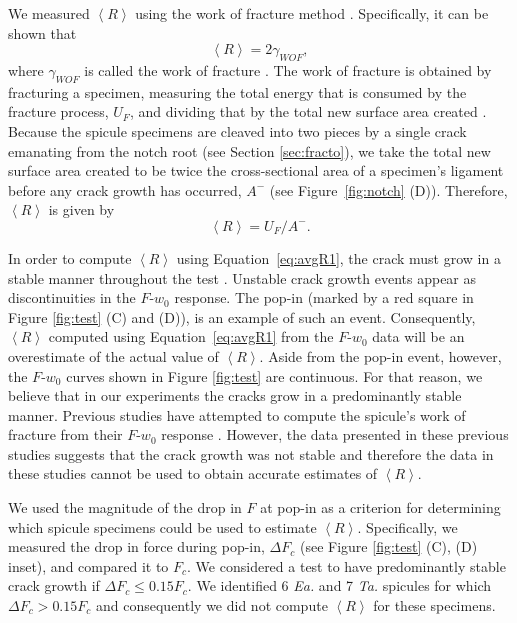 \documentclass[12pt,onecolumn]{article}
\makeatletter
\newcommand{\TA}{\textit{Ta.\@}\xspace}
\newcommand{\EA}{\textit{Ea.\@}\xspace}
\makeatother
\begin{document}
\begin{bibunit}
We measured $\left< R\right>$ using the work of fracture method \cite{nakayama1981crack,sakai1992work}. Specifically, it can be shown that 
%
\begin{equation}
    \label{eq:Rwof}
    \left< R \right>=2 \gamma_{WOF},
\end{equation}
%
where $\gamma_{WOF}$ is called the work of fracture \cite{sakai1992work}. The work of fracture is obtained by fracturing a specimen, measuring the total energy that is consumed by the fracture process, $U_F$, and dividing that by the total new surface area created \cite{nakayama1981crack}. Because the spicule specimens are cleaved into two pieces by a single crack emanating from the notch root (see Section \ref{sec:fracto}), we take the total new surface area created to be twice the cross-sectional area of a specimen's ligament before any crack growth has occurred, $A^-$ (see Figure~\ref{fig:notch} (D)). Therefore, $\left< R \right>$ is given by 
%
\begin{equation}
    \label{eq:avgR1}
    \left< R \right> = U_F/A^-.
\end{equation}
%

In order to compute $\left< R \right>$ using Equation~\eqref{eq:avgR1}, the crack must grow in a stable manner throughout the test \cite{tattersall1966work,davidge1968effective}. Unstable crack growth events appear as discontinuities in the $F$-$w_0$ response. The pop-in (marked by a red square in Figure \ref{fig:test} (C) and (D)), is an example of such an event. Consequently, $\left< R \right>$ computed using Equation~\eqref{eq:avgR1} from the $F$-$w_0$ data will be an overestimate of the actual value of $\left< R \right>$. Aside from the pop-in event, however, the $F$-$w_0$ curves shown in Figure \ref{fig:test} are continuous. For that reason, we believe that in our experiments the cracks grow in a predominantly stable manner. Previous studies have attempted to compute the spicule's work of fracture from their $F$-$w_0$ response \cite{walter2007mechanisms, mayer2005rigid}. However, the data presented in these previous studies suggests that the crack growth was not stable and therefore the data in these studies cannot be used to obtain accurate estimates of $\left< R \right>$. 

We used the magnitude of the drop in $F$ at pop-in as a criterion for determining which spicule specimens could be used to estimate $\left< R\right>$. Specifically, we measured the drop in force during pop-in, $\Delta F_c$ (see Figure \ref{fig:test} (C), (D) inset), and compared it to $F_c$. We considered a test to have predominantly stable crack growth if $\Delta F_c \leq 0.15 F_c$. We identified 6 \EA and 7 \TA spicules for which $\Delta F_c > 0.15 F_c$ and consequently we did not compute $\left< R \right>$ for these specimens.


\end{bibunit}
\end{document}
